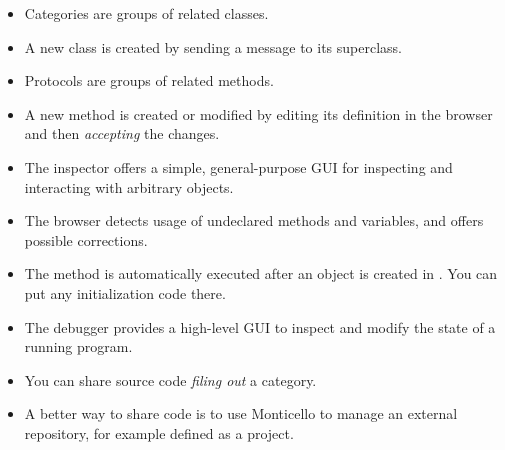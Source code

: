 \documentclass[a4paper,10pt,twoside]{book}
\begin{document}
\begin{itemize}
  \item Categories are groups of related classes.
  \item A new class is created by sending a message to its superclass.
  \item Protocols are groups of related methods.
  \item A new method is created or modified by editing its definition in the browser and then \emph{accepting} the changes.
  \item The inspector offers a simple, general-purpose GUI for inspecting and interacting with arbitrary objects.
  \item The browser detects usage of undeclared methods and variables, and offers possible corrections.
  \item The  method is automatically executed after an object is created in \pharo. You can put any initialization code there.
  \item The debugger provides a high-level GUI to inspect and modify the state of a running program.
  \item You can share source code \emph{filing out} a category.
  \item A better way to share code is to use Monticello to manage an external repository, for example defined as a \sqsrc project.
\end{itemize}

\ifx\wholebook\relax\else
\end{document}
